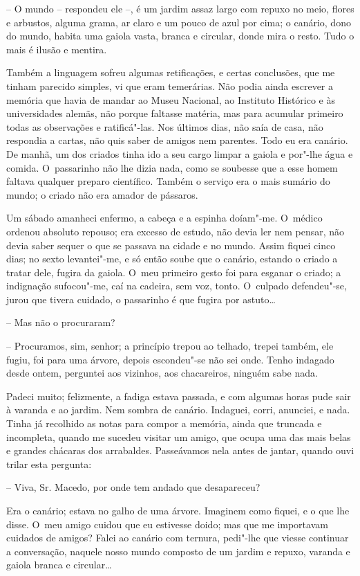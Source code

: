 -- O mundo -- respondeu ele --, é um jardim assaz largo com repuxo no
meio, flores e arbustos, alguma grama, ar claro e um pouco de azul por
cima; o canário, dono do mundo, habita uma gaiola vasta, branca e
circular, donde mira o resto. Tudo o mais é ilusão e mentira.

Também a linguagem sofreu algumas retificações, e certas conclusões, que
me tinham parecido simples, vi que eram temerárias. Não podia ainda
escrever a memória que havia de mandar ao Museu Nacional, ao Instituto
Histórico e às universidades alemãs, não porque faltasse matéria, mas
para acumular primeiro todas as observações e ratificá"-las. Nos últimos
dias, não saía de casa, não respondia a cartas, não quis saber de amigos
nem parentes. Todo eu era canário. De manhã, um dos criados tinha ido a
seu cargo limpar a gaiola e por"-lhe água e comida. O~passarinho não lhe
dizia nada, como se soubesse que a esse homem faltava qualquer preparo
científico. Também o serviço era o mais sumário do mundo; o criado não
era amador de pássaros.

Um sábado amanheci enfermo, a cabeça e a espinha doíam"-me. O~médico
ordenou absoluto repouso; era excesso de estudo, não devia ler nem
pensar, não devia saber sequer o que se passava na cidade e no mundo.
Assim fiquei cinco dias; no sexto levantei"-me, e só então soube que o
canário, estando o criado a tratar dele, fugira da gaiola. O~meu
primeiro gesto foi para esganar o criado; a indignação sufocou"-me, caí
na cadeira, sem voz, tonto. O~culpado defendeu"-se, jurou que tivera
cuidado, o passarinho é que fugira por astuto\ldots{}

-- Mas não o procuraram?

-- Procuramos, sim, senhor; a princípio trepou ao telhado, trepei
também, ele fugiu, foi para uma árvore, depois escondeu"-se não sei onde.
Tenho indagado desde ontem, perguntei aos vizinhos, aos chacareiros,
ninguém sabe nada.

Padeci muito; felizmente, a fadiga estava passada, e com algumas horas
pude sair à varanda e ao jardim. Nem sombra de canário. Indaguei, corri,
anunciei, e nada. Tinha já recolhido as notas para compor a memória,
ainda que truncada e incompleta, quando me sucedeu visitar um amigo, que
ocupa uma das mais belas e grandes chácaras dos arrabaldes. Passeávamos
nela antes de jantar, quando ouvi trilar esta pergunta:

-- Viva, Sr. Macedo, por onde tem andado que desapareceu?

Era o canário; estava no galho de uma árvore. Imaginem como fiquei, e o
que lhe disse. O~meu amigo cuidou que eu estivesse doido; mas que me
importavam cuidados de amigos? Falei ao canário com ternura, pedi"-lhe
que viesse continuar a conversação, naquele nosso mundo composto de um
jardim e repuxo, varanda e gaiola branca e circular\ldots{}

